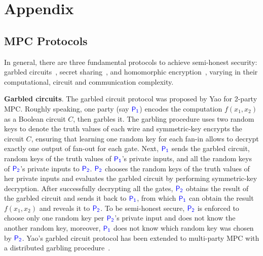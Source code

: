 \section{Appendix}\label{sec:appendix}

\subsection{MPC Protocols}\label{sec:protocols}
In general, there are three fundamental protocols to achieve semi-honest security:
garbled circuits~\cite{yao82,freexor,BeaverMR90}, secret sharing~\cite{Shamir79,GMW}, and homomorphic encryption~\cite{SHE},
varying in their computational, circuit and communication complexity.

\smallskip
\noindent
{\bf Garbled circuits}. The garbled circuit protocol was proposed by Yao for 2-party MPC.
Roughly speaking,
one party (say ${\textcolor{blue}{\sf P_{1}}}$) encodes
the computation $f(x_1,x_2)$ as a Boolean circuit $C$, then garbles it.
The garbling procedure uses two random keys to denote the truth values of each wire
and symmetric-key encrypts the circuit $C$, ensuring that learning one random key for each fan-in allows to decrypt exactly one output of fan-out for each gate.
Next, ${\textcolor{blue}{\sf P_{1}}}$ sends the garbled circuit, random keys of the truth values of ${\textcolor{blue}{\sf P_{1}}}$'s private inputs,
and all the random keys of ${\textcolor{blue}{\sf P_{2}}}$'s private inputs
to ${\textcolor{blue}{\sf P_{2}}}$. %
${\textcolor{blue}{\sf P_{2}}}$ chooses the random keys of the truth values of her private inputs and evaluates the garbled circuit %
by performing symmetric-key decryption. %
After successfully decrypting all the gates, ${\textcolor{blue}{\sf P_{2}}}$ obtains the result of the garbled circuit
and sends it back to ${\textcolor{blue}{\sf P_{1}}}$, from which ${\textcolor{blue}{\sf P_{1}}}$ can obtain the result $f(x_1,x_2)$ and reveals
it to ${\textcolor{blue}{\sf P_{2}}}$. To be semi-honest secure,
${\textcolor{blue}{\sf P_{2}}}$ is enforced to choose only one random key per ${\textcolor{blue}{\sf P_{2}}}$'s private input and does not know the another random key, moreover, ${\textcolor{blue}{\sf P_{1}}}$ does not know which random key
was chosen by  ${\textcolor{blue}{\sf P_{2}}}$.
Yao's garbled circuit protocol has been extended to multi-party MPC
with a distributed garbling procedure~\cite{BeaverMR90}.


